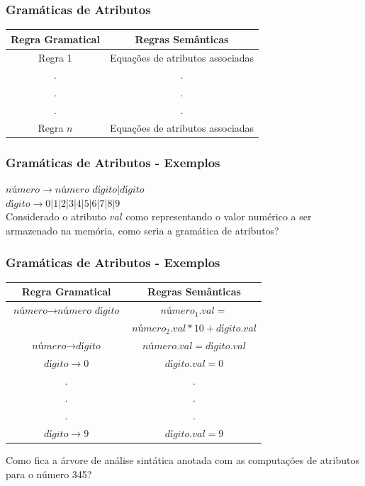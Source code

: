 \documentclass[table]{beamer}
\begin{document}
\begin{frame}
   \frametitle{Gramáticas de Atributos}
   \begin{table}
      \begin{tabular}{cc}
      Regra Gramatical & Regras Semânticas \\
      \hline 
      Regra 1 & Equações de atributos associadas \\
        .     & . \\
        .     & . \\
        .     & . \\
      Regra $n$ & Equações de atributos associadas \\
      \hline
      \end{tabular}
   \end{table}
\end{frame}

\begin{frame}
   \frametitle{Gramáticas de Atributos - Exemplos}
   $\textit{número}\to\textit{número dígito}|\textit{dígito}$ \\
   \vspace{1.0cm}
   $\textit{dígito}\to0|1|2|3|4|5|6|7|8|9$ \\
   Considerado o atributo $val$ como representando o valor numérico a ser armazenado na memória, como seria a gramática de atributos?
\end{frame}

\begin{frame}
   \frametitle{Gramáticas de Atributos - Exemplos}
   \begin{table}
      \begin{tabular}{cc}
      Regra Gramatical & Regras Semânticas \\
      \hline 
       $\textit{número}\to\textit{número dígito}$ & $\textit{número}_{1}.val=$                          \\
                                                  & $\textit{número}_{2}.val*10 + \textit{dígito}.val$  \\
       $\textit{número}\to\textit{dígito}$        & $\textit{número}.val=\textit{dígito}.val$           \\
       $\textit{dígito}\to0$                      & $\textit{dígito}.val=0$                             \\
        .     & . \\
        .     & . \\
        .     & . \\
       $\textit{dígito}\to9$                      & $\textit{dígito}.val=9$                             \\
      \hline
      \end{tabular}
   \end{table}
   Como fica a árvore de análise sintática anotada com as computações de atributos para o número 345?
\end{frame}
\end{document}

